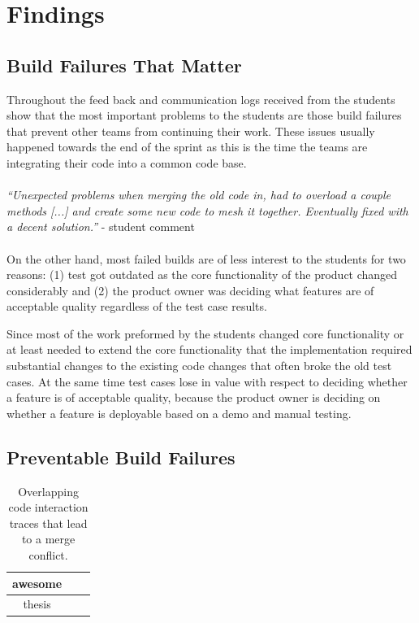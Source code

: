 \section{Findings}
\subsection{Build Failures That Matter}
Throughout the feed back and communication logs received from the students show that the most important problems to the students are those build failures that prevent other teams from continuing their work.
These issues usually happened towards the end of the sprint as this is the time the teams are integrating their code into a common code base.
\\ \ \\
\indent\emph{``Unexpected problems when merging the old code in, had to overload a couple methods [...]  and create some new code to mesh it together.  Eventually fixed with a decent solution.''} - student comment
\\ \ \\
On the other hand, most failed builds are of less interest to the students for two reasons: 
(1) test got outdated as the core functionality of the product changed considerably 
and (2) the product owner was deciding what features are of acceptable quality regardless of the test case results.

Since most of the work preformed by the students changed core functionality or at least needed to extend the core functionality that the implementation required substantial changes to the existing code changes that often broke the old test cases.
At the same time test cases lose in value with respect to deciding whether a feature is of acceptable quality, because the product owner is deciding on whether a feature is deployable based on a demo and manual testing.

\subsection{Preventable Build Failures}
\begin{table}[ht]
\centering
\begin{tabular}{ccc}
\toprule
awesome\\
\midrule
thesis\\
\bottomrule
\end{tabular}
\label{tab:overlappingtraces}
\caption{Overlapping code interaction traces that lead to a merge conflict.}
\end{table}

